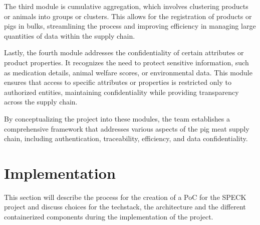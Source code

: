 \documentclass[oneside,a4paper,12pt, colorinlistoftodos]{article} %
\begin{document}
The third module is cumulative aggregation, which involves clustering products or animals into groups or clusters. This allows for the registration of products or pigs in bulks, streamlining the process and improving efficiency in managing large quantities of data within the supply chain.

Lastly, the fourth module addresses the confidentiality of certain attributes or product properties. It recognizes the need to protect sensitive information, such as medication details, animal welfare scores, or environmental data. This module ensures that access to specific attributes or properties is restricted only to authorized entities, maintaining confidentiality while providing transparency across the supply chain.

By conceptualizing the project into these modules, the team establishes a comprehensive framework that addresses various aspects of the pig meat supply chain, including authentication, traceability, efficiency, and data confidentiality.

\section{Implementation}

This section will describe the process for the creation of a PoC for the SPECK project and discuss choices for the techstack, the architecture and the different containerized components during the implementation of the project.

\end{document}
